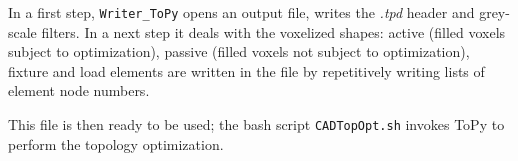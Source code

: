In a first step, \lstinline|Writer_ToPy| opens an output file, writes the {\it.tpd} header and grey-scale filters. In a next step it deals with the voxelized shapes: active (filled voxels subject to optimization), passive (filled voxels not subject to optimization), fixture and load elements are written in the file by repetitively writing lists of element node numbers.   

This file is then ready to be used; the bash script \lstinline|CADTopOpt.sh| invokes ToPy to perform the topology optimization. 